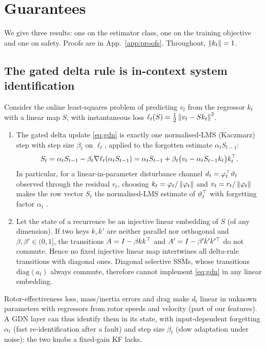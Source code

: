 \section{Guarantees}
\label{sec:guarantees}

We give three results: one on the estimator class, one on the training objective and one on safety. Proofs are in App.~\ref{app:proofs}. Throughout, $\left\lVert k_t \right\rVert=1$.

\subsection{The gated delta rule is in-context system identification}

\begin{proposition}[GDN $=$ NLMS with forgetting]
\label{prop:nlms}
Consider the online least-squares problem of predicting $v_t$ from the regressor $k_t$ with a linear map $S$, with instantaneous loss $\ell_t(S)=\tfrac12\left\lVert v_t-Sk_t \right\rVert^2$.
\begin{enumerate}
  \item[(a)] The gated delta update \eqref{eq:gdn} is exactly one normalised-LMS (Kaczmarz) step with step size $\beta_t$ on $\ell_t$, applied to the forgotten estimate $\alpha_t S_{t-1}$:
  \[
    S_t=\alpha_t S_{t-1}-\beta_t\nabla\ell_t(\alpha_t S_{t-1}) = \alpha_t S_{t-1}+\beta_t\big(v_t-\alpha_t S_{t-1}k_t\big)k_t^{\top}.
  \]
  In particular, for a linear-in-parameter disturbance channel $d_t=\varphi_t^{\top}\vartheta_t$ observed through the residual $r_t$, choosing $k_t=\varphi_t/\left\lVert \varphi_t \right\rVert$ and $v_t=r_t/\left\lVert \varphi_t \right\rVert$ makes the row vector $S_t$ the normalised-LMS estimate of $\vartheta_t^{\top}$ with forgetting factor $\alpha_t$ \citep{widrow1960adaptive}.
  \item[(b)] Let the state of a recurrence be an injective linear embedding of $S$ (of any dimension). If two keys $k,k'$ are neither parallel nor orthogonal and $\beta,\beta'\in(0,1]$, the transitions $A=I-\beta kk^{\top}$ and $A'=I-\beta'k'k'^{\top}$ do not commute. Hence no fixed injective linear map intertwines all delta-rule transitions with diagonal ones. Diagonal selective SSMs, whose transitions $\mathrm{diag}(a_t)$ always commute, therefore cannot implement \eqref{eq:gdn} in any linear embedding.
\end{enumerate}
\end{proposition}
Rotor-effectiveness loss, mass/inertia errors and drag make $d_t$ linear in unknown parameters with regressors from rotor speeds and velocity (part of our features). A GDN layer can thus identify them in its state, with input-dependent forgetting $\alpha_t$ (fast re-identification after a fault) and step size $\beta_t$ (slow adaptation under noise): the two knobs a fixed-gain KF lacks.

